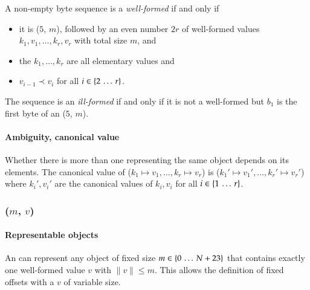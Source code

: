 A non-empty byte sequence  is a \emph{well-formed}
 if and only if
\begin{itemize}
    \item
    it is ($5$, $m$),
    followed by an even number $2 r$ of well-formed values $k_1, v_1, \ldots, k_r, v_r$
    with total size $m$, and

    \item
    the $k_1, \ldots, k_r$ are all elementary values and

    \item
    $v_{i - 1} \prec v_{i}$ for all $i \in \{2 \,\ldots\, r\}$.
\end{itemize}
The sequence is an \emph{ill-formed}  if and only if it is not a well-formed
 but $b_1$ is the first byte of an ($5$, $m$).

\paragraph{Ambiguity, canonical value}

Whether there is more than one  representing the same object depends on its
elements.
The canonical value of ($k_1 \mapsto v_1, \ldots, k_r \mapsto v_r$) is
($k_1' \mapsto v_1', \ldots, k_r' \mapsto v_r'$)
where $k_i', v_i'$ are the canonical values of $k_i, v_i$ for all $i \in \{1 \,\ldots\, r\}$.


\subsubsection{($m$, $v$)}
\hypertarget{sec:def:AllocatedValue}{}

\paragraph{Representable objects}

An  can represent any object of fixed size $m \in \{0 \,\ldots\, N + 23\}$
that contains exactly one well-formed value $v$ with $\|v\| \le m$.
This allows the definition of fixed offsets with a $v$ of variable size.

